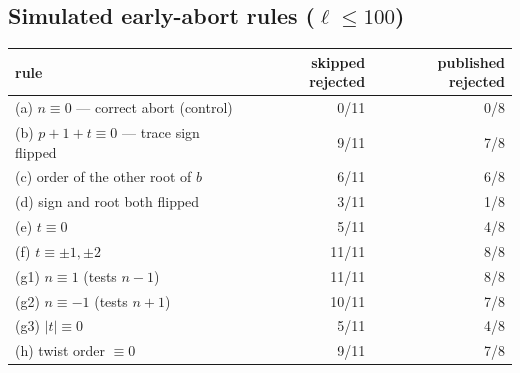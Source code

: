 \subsection{Simulated early-abort rules ($\ell\le100$)}
\begin{center}\small
\begin{tabular}{lrr}
\toprule
rule & skipped rejected & published rejected \\
\midrule
(a) $n\equiv0$ --- correct abort (control) & 0/11 & 0/8 \\
(b) $p+1+t\equiv0$ --- trace sign flipped & 9/11 & 7/8 \\
(c) order of the other root of $b$ & 6/11 & 6/8 \\
(d) sign and root both flipped & 3/11 & 1/8 \\
(e) $t\equiv0$ & 5/11 & 4/8 \\
(f) $t\equiv\pm1,\pm2$ & 11/11 & 8/8 \\
(g1) $n\equiv1$ (tests $n-1$) & 11/11 & 8/8 \\
(g2) $n\equiv-1$ (tests $n+1$) & 10/11 & 7/8 \\
(g3) $|t|\equiv0$ & 5/11 & 4/8 \\
(h) twist order $\equiv0$ & 9/11 & 7/8 \\
\bottomrule
\end{tabular}
\end{center}

